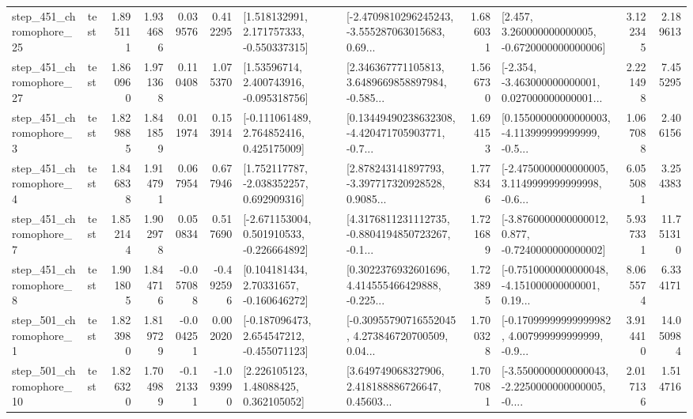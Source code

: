 \begin{tabular}{llrrrrllrlrr}
  step\_451\_chromophore\_25 &      test &      1.895111 &    1.934686 &      0.039576 &  0.412295 &    [1.518132991, 2.171757333, -0.550337315] &  [-2.4709810296245243, -3.555287063015683, 0.69... &       1.686031 &    [2.457, 3.260000000000005, -0.6720000000000006] &            3.122345 &          2.189613 \\
  step\_451\_chromophore\_27 &      test &      1.860960 &    1.971368 &      0.110408 &  1.075370 &     [1.53596714, 2.400743916, -0.095318756] &  [2.346367771105813, 3.6489669858897984, -0.585... &       1.566730 &  [-2.354, -3.463000000000001, 0.027000000000001... &            2.221498 &          7.455295 \\
   step\_451\_chromophore\_3 &      test &      1.829885 &    1.841859 &      0.011974 &  0.153914 &    [-0.111061489, 2.764852416, 0.425175009] &  [0.13449490238632308, -4.420471705903771, -0.7... &       1.694153 &  [0.15500000000000003, -4.113999999999999, -0.5... &            1.067088 &          2.406156 \\
   step\_451\_chromophore\_4 &      test &      1.846838 &    1.914791 &      0.067954 &  0.677946 &    [1.752117787, -2.038352257, 0.692909316] &  [2.878243141897793, -3.397717320928528, 0.9085... &       1.778346 &  [-2.4750000000000005, 3.1149999999999998, -0.6... &            6.055081 &          3.254383 \\
   step\_451\_chromophore\_7 &      test &      1.852144 &    1.902978 &      0.050834 &  0.517690 &   [-2.671153004, 0.501910533, -0.226664892] &  [4.3176811231112735, -0.8804194850723267, -0.1... &       1.721689 &  [-3.8760000000000012, 0.877, -0.7240000000000002] &            5.937331 &         11.751310 \\
   step\_451\_chromophore\_8 &      test &      1.901805 &    1.844716 &     -0.057088 & -0.492596 &     [0.104181434, 2.70331657, -0.160646272] &  [0.3022376932601696, 4.414555466429888, -0.225... &       1.723895 &  [-0.7510000000000048, -4.151000000000001, 0.19... &            8.065574 &          6.334171 \\
   step\_501\_chromophore\_1 &      test &      1.823980 &    1.819729 &     -0.004251 &  0.002020 &   [-0.187096473, 2.654547212, -0.455071123] &  [-0.30955790716552045, 4.273846720700509, 0.04... &       1.700328 &  [-0.17099999999999982, 4.007999999999999, -0.9... &            3.914410 &         14.050984 \\
  step\_501\_chromophore\_10 &      test &      1.826320 &    1.704989 &     -0.121331 & -1.093990 &      [2.226105123, 1.48088425, 0.362105052] &  [3.649749068327906, 2.418188886726647, 0.45603... &       1.707081 &  [-3.5500000000000043, -2.2250000000000005, -0.... &            2.017136 &          1.514716 \\

\end{tabular}
